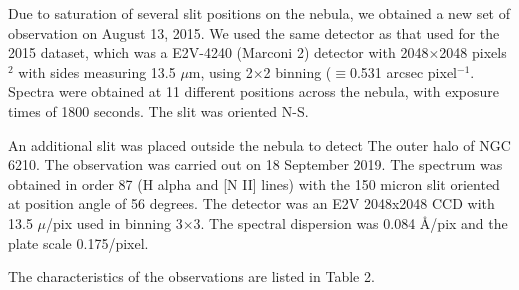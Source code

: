 \documentclass{aa}
\begin{document}
Due to saturation of several slit positions on the nebula, we obtained a 
new set of observation on August 13, 2015. We used the same detector as 
that used for the 2015 dataset, which was a E2V-4240 (Marconi 2)  detector 
with 2048$\times$2048 pixels$^2$ 
with sides measuring 13.5 $\mu$m, using 2$\times$2 binning 
($\equiv$0.531 arcsec pixel$^{-1}$. Spectra were obtained at 11 different 
positions across the nebula, with exposure times of 1800 seconds. The slit 
was oriented N-S. 

An additional slit was placed outside the nebula 
to detect The outer halo of NGC 6210. The observation was carried out on 18 September 2019.  The spectrum was obtained in order 87 (H alpha and [N II] lines) with the 150 micron slit oriented at position angle of 56 degrees.  The detector was an E2V 2048x2048 CCD with 13.5 $\mu$/pix used in binning 3$\times$3.  The spectral dispersion was 0.084 \AA/pix and the plate scale 0.175\arcsec/pixel.

The characteristics of the observations are listed in Table 2.
\end{document}
